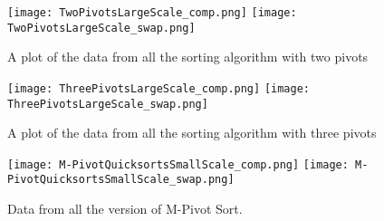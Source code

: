 		\begin{figure}[ht!]
			\begin{center}
				\texttt{[image: TwoPivotsLargeScale\_comp.png]}
				\texttt{[image: TwoPivotsLargeScale\_swap.png]}
				\caption{A plot of the data from all the sorting algorithm with two pivots}
			\label{fig:TwoPivot}
			\end{center}
		\end{figure}

		\begin{figure}[ht!]
			\begin{center}
				\texttt{[image: ThreePivotsLargeScale\_comp.png]}
				\texttt{[image: ThreePivotsLargeScale\_swap.png]}
				\caption{A plot of the data from all the sorting algorithm with three pivots}
				\label{fig:ThreePivot}
			\end{center}
		\end{figure}

		\begin{figure}[ht!]
			\begin{center}
				\texttt{[image: M-PivotQuicksortsSmallScale\_comp.png]}
				\texttt{[image: M-PivotQuicksortsSmallScale\_swap.png]}
				\caption{Data from all the version of M-Pivot Sort.}
				\label{fig:MPivot}
			\end{center}
		\end{figure}
